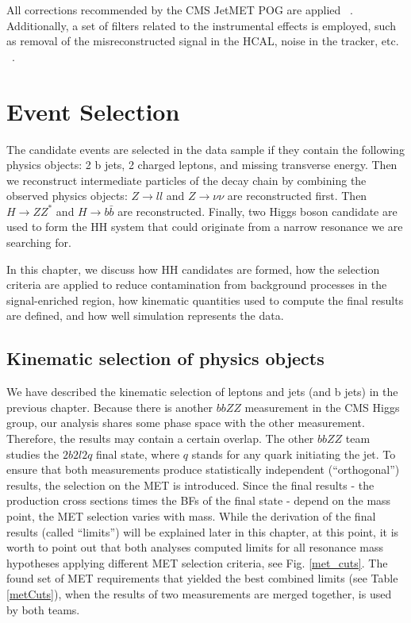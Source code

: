 \begin{small}
All corrections recommended by the CMS JetMET POG are applied ~\cite{MissingETRun2Corrections}. Additionally, a set of filters related to the instrumental effects is employed, such as removal of the misreconstructed signal in the HCAL, noise in the tracker, etc. ~\cite{MissingETOptionalFiltersRun2}. 

\section{Event Selection}\label{sec:selection}

The candidate events are selected in the data sample if they contain the following physics objects: 2 b jets, 2 charged leptons, and missing transverse energy. Then we reconstruct intermediate particles of the decay chain by combining the observed physics objects: $Z \to ll$ and $Z \to \nu \nu$ are reconstructed first. Then $H \to ZZ^*$ and $H \to b\bar{b}$ are reconstructed. Finally, two Higgs boson candidate are used to form the HH system that could originate from a narrow resonance we are searching for.

In this chapter, we discuss how HH candidates are formed, how the selection criteria are applied to reduce contamination from background processes in the signal-enriched region, how kinematic quantities used to compute the final results are defined, and how well simulation represents the data.

\subsection{Kinematic selection of physics objects}
We have described the kinematic selection of leptons and jets (and b jets) in the previous chapter. Because there is another $bbZZ$ measurement in the CMS Higgs group, our analysis shares some phase space with the other measurement. Therefore, the results may contain a certain overlap. The other $bbZZ$ team studies the $2 b 2 l 2 q$ final state, where $q$ stands for any quark initiating the jet. To ensure that both measurements produce statistically independent (``orthogonal'') results, the selection on the MET is introduced. Since the final results - the production cross sections times the BFs of the final state - depend on the mass point, the MET selection varies with mass. While the derivation of the final results (called ``limits'') will be explained later in this chapter, at this point, it is worth to point out that both analyses computed limits for all resonance mass hypotheses applying different MET selection criteria, see Fig. \ref{met_cuts}. The found set of MET requirements that yielded the best combined limits (see Table \ref{metCuts}), when the results of two measurements are merged together, is used by both teams. %


\end{small}
